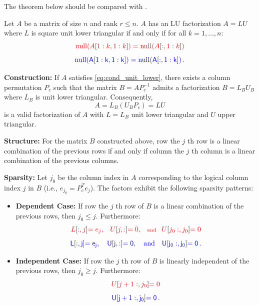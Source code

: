 \documentclass[10pt,twoside]{siamart1116}
\DeclareMathOperator{\nl}{null}
\numberwithin{theorem}{section}
\providecommand{\DIFadd}[1]{{\protect\color{blue} \sf #1}} %
\providecommand{\DIFdel}[1]{{\protect\color{red} \scriptsize #1}} %
\providecommand{\DIFaddbegin}{} %
\providecommand{\DIFaddend}{} %
\providecommand{\DIFdelbegin}{} %
\providecommand{\DIFdelend}{} %
\begin{document}
The theorem below should be compared with .

\begin{theorem}\label{thm:main_unit_lower}
  Let $A$ be a matrix of size $n$ and rank $r \le n$. $A$ has an LU factorization $A = LU$ where $L$ is square unit lower triangular if and only if for all $k = 1, \ldots, n$:
  \DIFdelbegin \begin{displaymath}
		\DIFdel{\label{eq:cond_unit_lower}
		\nl(A}[\DIFdel{1:k,1:k}]\DIFdel{) = \nl(A}[\DIFdel{:,1:k}]\DIFdel{)
	}\end{displaymath}%
\DIFdelend \DIFaddbegin \begin{equation}
    \DIFadd{\label{eq:cond_unit_lower}
    \nl(A}[\DIFadd{1:k,1:k}]\DIFadd{) = \nl(A}[\DIFadd{:,1:k}]\DIFadd{) \,.
  }\end{equation}\DIFaddend 

  \noindent\textbf{Construction:} If $A$ satisfies \DIFdelbegin %
\DIFdelend \DIFaddbegin \cref{eq:cond_unit_lower}\DIFaddend , there exists a column permutation $P_c$ such that the matrix $B = A P_c^{-1}$ admits a factorization $B = L_B U_B$ where $L_B$ is unit lower triangular. Consequently,
  \[ A = L_B (U_B P_c) = L U \]
  is a valid factorization of $A$ with $L=L_B$ unit lower triangular and $U$ upper triangular.

  \noindent\textbf{Structure:} For the matrix $B$ constructed above, \DIFdelbegin \DIFdel{row }\DIFdelend \DIFaddbegin \DIFadd{the }\DIFaddend $j$\DIFaddbegin \DIFadd{th row }\DIFaddend is a linear combination of the previous rows if and only if \DIFdelbegin \DIFdel{column }\DIFdelend \DIFaddbegin \DIFadd{the }\DIFaddend $j$\DIFaddbegin \DIFadd{th column }\DIFaddend is a linear combination of the previous columns.

  \noindent\textbf{Sparsity:} Let $j_0$ be the column index in $A$ corresponding to the logical column index $j$ in $B$ (i.e., $e_{j_0} = P_c^T e_j$). The factors exhibit the following sparsity patterns:
  \begin{itemize}
    \item \textbf{Dependent Case:} If \DIFdelbegin \DIFdel{row }\DIFdelend \DIFaddbegin \DIFadd{the }\DIFaddend $j$\DIFaddbegin \DIFadd{th row }\DIFaddend of $B$ is a linear combination of the previous rows, then $j_0 \le j$. Furthermore:
      \DIFdelbegin \[ \DIFdel{L}[\DIFdel{:,j}] \DIFdel{= e_j, \quad U}[\DIFdel{j,:}] \DIFdel{= 0, \quad \text{and} \quad U}[\DIFdel{j_0:, j_0}] \DIFdel{= 0 }\]%
\DIFdelend \DIFaddbegin \[ \DIFadd{L}[\DIFadd{:,j}] \DIFadd{= e_j, \quad U}[\DIFadd{j,:}] \DIFadd{= 0, \quad \text{and} \quad U}[\DIFadd{j_0:, j_0}] \DIFadd{= 0 \,. }\]\DIFaddend 
    \item \textbf{Independent Case:} If \DIFdelbegin \DIFdel{row }\DIFdelend \DIFaddbegin \DIFadd{the }\DIFaddend $j$\DIFaddbegin \DIFadd{th row }\DIFaddend of $B$ is linearly independent of the previous rows, then $j_0 \ge j$. Furthermore:
      \DIFdelbegin \[ \DIFdel{U}[\DIFdel{j+1:, j_0}] \DIFdel{= 0 }\]%
\DIFdelend \DIFaddbegin \[ \DIFadd{U}[\DIFadd{j+1:, j_0}] \DIFadd{= 0 \,. }\]\DIFaddend 
  \end{itemize}
\end{theorem}
\end{document}
